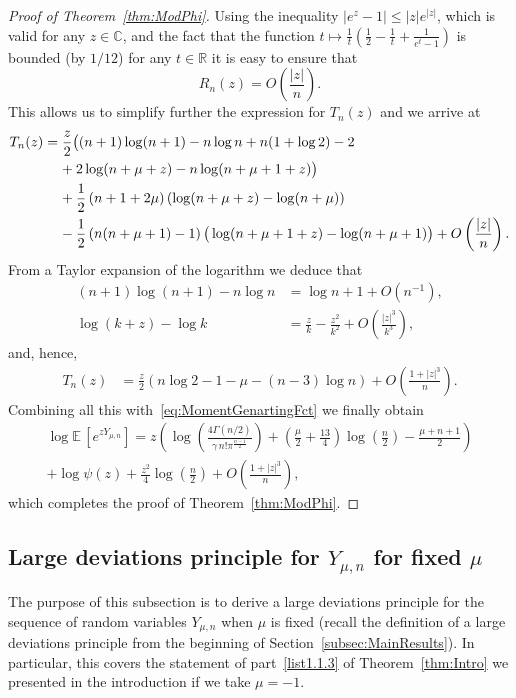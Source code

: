 \documentclass[AHL,Unicode,longabstracts,published]{cedram}
\newcommand{\R}{\mathbb{R}}
\newcommand{\EE}{\mathbb{E}\,}
\begin{document}
\begin{proof}[Proof of Theorem~\ref{thm:ModPhi}]
\goodbreak
Using the inequality $|e^z-1|\leq |z|e^{|z|}$, which is valid for any $z\in \mathbb{C}$, and the fact that the function $t\mapsto \frac{1}{t}(\frac{1}{2}-\frac{1}{t}+\frac{1}{e^t-1})$ is bounded (by $1/12$) for any $t\in\R$ it is easy to ensure that
\[
R_n(z)=O\left(\frac{|z|}{n}\right).
\]
This allows us to simplify further the expression for $T_n(z)$ and we arrive at
\begin{align*}
T_n(z)&=\frac{z}{2}\big((n+1)\log(n+1)-n\log n+n(1+\log 2)-2\\
&\mkern20mu +2\log(n+\mu+z)-n\log (n+\mu+1+z)\big)\\
&\mkern20mu +\frac{1}{2}\left(n+1+2\mu\right)(\log(n+\mu+z)-\log(n+\mu))\\
&\mkern20mu -\frac{1}{2}\left(n(n+\mu+1)-1\right)\big(\log(n+\mu+1+z)-\log(n+\mu+1)\big)+O\left(\frac{|z|}{n}\right).
\end{align*}
From a Taylor expansion of the logarithm we deduce that
\begin{align*}
(n+1)\log(n+1)-n\log n&=\log n+1+O\left(n^{-1}\right),\\
\log(k+z)-\log k&=\frac{z}{k}-\frac{z^2}{k^2}+O\left(\frac{|z|^3}{k^3}\right),
\end{align*}
and, hence,
\begin{align*}
T_n(z)&=\frac{z}{2}\left(n\log 2-1-\mu-(n-3)\log n\right)+O\left(\frac{1+|z|^3}{n}\right).
\end{align*}
Combining all this with~\eqref{eq:MomentGenartingFct} we finally obtain
\begin{multline}\label{eq:AsympMomentGenFct}
\log \EE \left[e^{zY_{\mu,n}}\right] =z\left(\log\left(\frac{4\Gamma(n/2)}{\gamma\,n!\pi^{\frac{n-1}{2}}}\right)+\left(\frac{\mu}{2}+\frac{13}{4}\right)\log\left(\frac{n}{2}\right)-\frac{\mu+n+1}{2}\right)\\
+\log \psi(z)+\frac{z^2}{4}\log \left(\frac{n}{2}\right)+O\left(\frac{1+|z|^3}{n}\right),
\end{multline}
which completes the proof of Theorem~\ref{thm:ModPhi}.
\end{proof}

\subsection{Large deviations principle for \texorpdfstring{$Y_{\mu,n}$}{Y mu,n} for fixed \texorpdfstring{$\mu$}{mu}}

The purpose of this subsection is to derive a large deviations principle for the sequence of random variables $Y_{\mu,n}$ when $\mu$ is fixed (recall the definition of a large deviations principle from the beginning of Section~\ref{subsec:MainResults}). In particular, this covers the statement of part~\eqref{list1.1.3} of Theorem~\ref{thm:Intro} we presented in the introduction if we take $\mu=-1$.
\end{document}

